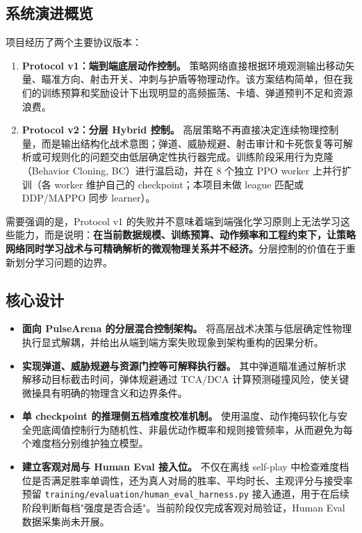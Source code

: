 \documentclass[UTF8,a4paper,11pt]{ctexart}
\begin{document}
\subsection{系统演进概览}
项目经历了两个主要协议版本：

\begin{enumerate}
    \item \textbf{Protocol v1：端到端底层动作控制。}
    策略网络直接根据环境观测输出移动矢量、瞄准方向、射击开关、冲刺与护盾等物理动作。该方案结构简单，但在我们的训练预算和奖励设计下出现明显的高频振荡、卡墙、弹道预判不足和资源浪费。
    \item \textbf{Protocol v2：分层 Hybrid 控制。}
    高层策略不再直接决定连续物理控制量，而是输出结构化战术意图；弹道、威胁规避、射击审计和卡死恢复等可解析或可规则化的问题交由低层确定性执行器完成。训练阶段采用行为克隆（Behavior Cloning, BC）进行温启动，并在 8 个独立 PPO worker 上并行扩训（各 worker 维护自己的 checkpoint；本项目未做 league 匹配或 DDP/MAPPO 同步 learner）。
\end{enumerate}

需要强调的是，Protocol v1 的失败并不意味着端到端强化学习原则上无法学习这些能力，而是说明：\textbf{在当前数据规模、训练预算、动作频率和工程约束下，让策略网络同时学习战术与可精确解析的微观物理关系并不经济。}分层控制的价值在于重新划分学习问题的边界。

\subsection{核心设计}

\begin{itemize}
    \item \textbf{面向 PulseArena 的分层混合控制架构。}
    将高层战术决策与低层确定性物理执行显式解耦，并给出从端到端方案失败现象到架构重构的因果分析。
    \item \textbf{实现弹道、威胁规避与资源门控等可解释执行器。}
    其中弹道瞄准通过解析求解移动目标截击时间，弹体规避通过 TCA/DCA 计算预测碰撞风险，使关键微操具有明确的物理含义和边界条件。
    \item \textbf{单 checkpoint 的推理侧五档难度校准机制。}
    使用温度、动作掩码软化与安全兜底阈值控制行为随机性、非最优动作概率和规则接管频率，从而避免为每个难度档分别维护独立模型。
    \item \textbf{建立客观对局与 Human Eval 接入位。}
    不仅在离线 self-play 中检查难度档位是否满足胜率单调性，还为真人对局的胜率、平均时长、主观评分与接受率预留 \texttt{training/evaluation/human\_eval\_harness.py} 接入通道，用于在后续阶段判断每档"强度是否合适"。当前阶段仅完成客观对局验证，Human Eval 数据采集尚未开展。
\end{itemize}
\end{document}
